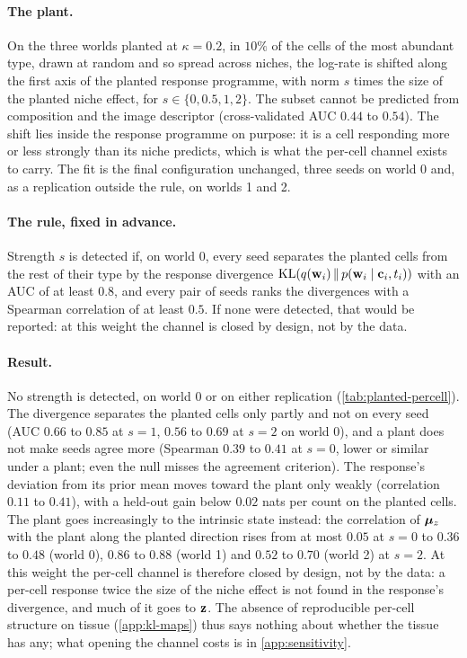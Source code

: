 \paragraph{The plant.} On the three worlds planted at $\kappa = 0.2$, in $10\%$ of the cells of the most abundant type, drawn at random and so spread across niches, the log-rate is shifted along the first axis of the planted response programme, with norm $s$ times the size of the planted niche effect, for $s \in \{0, 0.5, 1, 2\}$. The subset cannot be predicted from composition and the image descriptor (cross-validated AUC $0.44$ to $0.54$). The shift lies inside the response programme on purpose: it is a cell responding more or less strongly than its niche predicts, which is what the per-cell channel exists to carry. The fit is the final configuration unchanged, three seeds on world 0 and, as a replication outside the rule, on worlds 1 and 2.

\paragraph{The rule, fixed in advance.} Strength $s$ is detected if, on world 0, every seed separates the planted cells from the rest of their type by the response divergence $\operatorname{KL}(q(\mathbf{w}_i)\,\|\,p(\mathbf{w}_i \mid \mathbf{c}_i, t_i))$ with an AUC of at least $0.8$, and every pair of seeds ranks the divergences with a Spearman correlation of at least $0.5$. If none were detected, that would be reported: at this weight the channel is closed by design, not by the data.

\paragraph{Result.} No strength is detected, on world 0 or on either replication (\cref{tab:planted-percell}). The divergence separates the planted cells only partly and not on every seed (AUC $0.66$ to $0.85$ at $s = 1$, $0.56$ to $0.69$ at $s = 2$ on world 0), and a plant does not make seeds agree more (Spearman $0.39$ to $0.41$ at $s = 0$, lower or similar under a plant; even the null misses the agreement criterion). The response's deviation from its prior mean moves toward the plant only weakly (correlation $0.11$ to $0.41$), with a held-out gain below $0.02$ nats per count on the planted cells. The plant goes increasingly to the intrinsic state instead: the correlation of $\boldsymbol{\mu}_z$ with the plant along the planted direction rises from at most $0.05$ at $s = 0$ to $0.36$ to $0.48$ (world 0), $0.86$ to $0.88$ (world 1) and $0.52$ to $0.70$ (world 2) at $s = 2$. At this weight the per-cell channel is therefore closed by design, not by the data: a per-cell response twice the size of the niche effect is not found in the response's divergence, and much of it goes to $\mathbf{z}$. The absence of reproducible per-cell structure on tissue (\cref{app:kl-maps}) thus says nothing about whether the tissue has any; what opening the channel costs is in \cref{app:sensitivity}.

